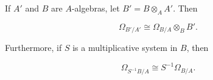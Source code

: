 If $A'$ and $B$ are $A$-algebras, let $B' = B \otimes_A A'$. Then

$$\Omega_{B'/A'} \cong \Omega_{B/A} \otimes_B B'.$$

Furthermore, if $S$ is a multiplicative system in $B$, then

$$\Omega_{S^{-1}B/A} \cong S^{-1}\Omega_{B/A}.$$

